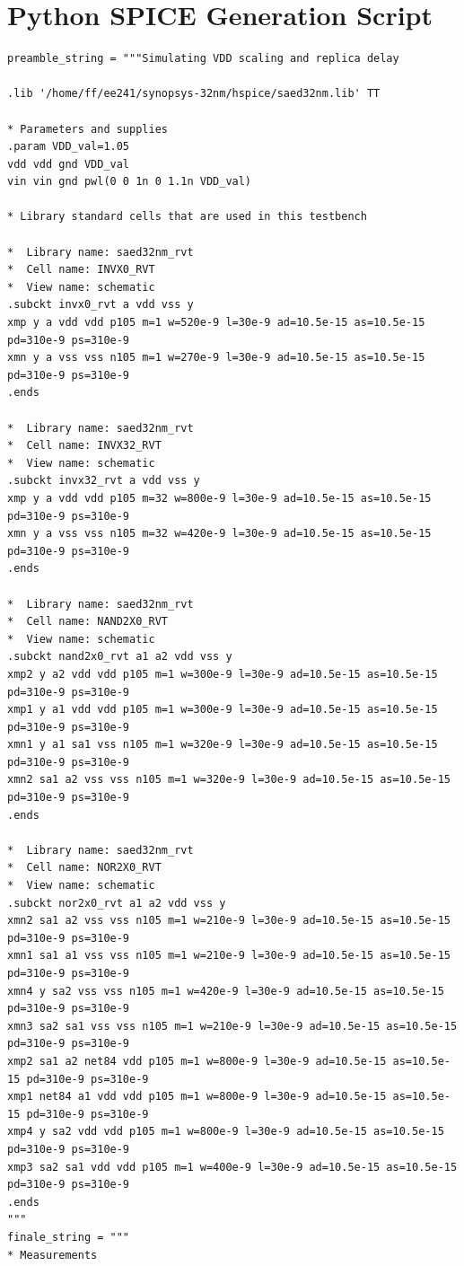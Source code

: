 \documentclass[11pt]{article}
\begin{document}
\section{Python SPICE Generation Script}
\begin{verbatim}
preamble_string = """Simulating VDD scaling and replica delay

.lib '/home/ff/ee241/synopsys-32nm/hspice/saed32nm.lib' TT

* Parameters and supplies
.param VDD_val=1.05
vdd vdd gnd VDD_val
vin vin gnd pwl(0 0 1n 0 1.1n VDD_val)

* Library standard cells that are used in this testbench

*  Library name: saed32nm_rvt
*  Cell name: INVX0_RVT
*  View name: schematic
.subckt invx0_rvt a vdd vss y
xmp y a vdd vdd p105 m=1 w=520e-9 l=30e-9 ad=10.5e-15 as=10.5e-15 pd=310e-9 ps=310e-9
xmn y a vss vss n105 m=1 w=270e-9 l=30e-9 ad=10.5e-15 as=10.5e-15 pd=310e-9 ps=310e-9
.ends

*  Library name: saed32nm_rvt
*  Cell name: INVX32_RVT
*  View name: schematic
.subckt invx32_rvt a vdd vss y
xmp y a vdd vdd p105 m=32 w=800e-9 l=30e-9 ad=10.5e-15 as=10.5e-15 pd=310e-9 ps=310e-9
xmn y a vss vss n105 m=32 w=420e-9 l=30e-9 ad=10.5e-15 as=10.5e-15 pd=310e-9 ps=310e-9
.ends 

*  Library name: saed32nm_rvt
*  Cell name: NAND2X0_RVT
*  View name: schematic
.subckt nand2x0_rvt a1 a2 vdd vss y
xmp2 y a2 vdd vdd p105 m=1 w=300e-9 l=30e-9 ad=10.5e-15 as=10.5e-15 pd=310e-9 ps=310e-9
xmp1 y a1 vdd vdd p105 m=1 w=300e-9 l=30e-9 ad=10.5e-15 as=10.5e-15 pd=310e-9 ps=310e-9
xmn1 y a1 sa1 vss n105 m=1 w=320e-9 l=30e-9 ad=10.5e-15 as=10.5e-15 pd=310e-9 ps=310e-9
xmn2 sa1 a2 vss vss n105 m=1 w=320e-9 l=30e-9 ad=10.5e-15 as=10.5e-15 pd=310e-9 ps=310e-9
.ends 

*  Library name: saed32nm_rvt
*  Cell name: NOR2X0_RVT
*  View name: schematic
.subckt nor2x0_rvt a1 a2 vdd vss y
xmn2 sa1 a2 vss vss n105 m=1 w=210e-9 l=30e-9 ad=10.5e-15 as=10.5e-15 pd=310e-9 ps=310e-9
xmn1 sa1 a1 vss vss n105 m=1 w=210e-9 l=30e-9 ad=10.5e-15 as=10.5e-15 pd=310e-9 ps=310e-9
xmn4 y sa2 vss vss n105 m=1 w=420e-9 l=30e-9 ad=10.5e-15 as=10.5e-15 pd=310e-9 ps=310e-9
xmn3 sa2 sa1 vss vss n105 m=1 w=210e-9 l=30e-9 ad=10.5e-15 as=10.5e-15 pd=310e-9 ps=310e-9
xmp2 sa1 a2 net84 vdd p105 m=1 w=800e-9 l=30e-9 ad=10.5e-15 as=10.5e-15 pd=310e-9 ps=310e-9
xmp1 net84 a1 vdd vdd p105 m=1 w=800e-9 l=30e-9 ad=10.5e-15 as=10.5e-15 pd=310e-9 ps=310e-9
xmp4 y sa2 vdd vdd p105 m=1 w=800e-9 l=30e-9 ad=10.5e-15 as=10.5e-15 pd=310e-9 ps=310e-9
xmp3 sa2 sa1 vdd vdd p105 m=1 w=400e-9 l=30e-9 ad=10.5e-15 as=10.5e-15 pd=310e-9 ps=310e-9
.ends 
"""
finale_string = """
* Measurements 


\end{verbatim}
\end{document}
